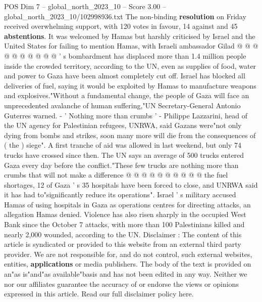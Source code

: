 \begin{textsample}{POS Dim 7 – global\_north\_2023\_10 – Score 3.00 – global\_north\_2023\_10/102998936.txt}
The non-binding \textbf{resolution} on Friday received overwhelming support, with 120 votes in favour, 14 against and 45 \textbf{abstentions}.
It was welcomed by Hamas but harshly criticised by Israel and the United States for failing to mention Hamas, with Israeli ambassador Gilad @ @ @ @ @ @ @ @ @ @ ' s bombardment has displaced more than 1.4 million people inside the crowded territory, according to the UN, even as supplies of food, water and power to Gaza have been almost completely cut off.
Israel has blocked all deliveries of fuel, saying it would be exploited by Hamas to manufacture weapons and explosives."Without a fundamental change, the people of Gaza will face an unprecedented avalanche of human suffering,"UN Secretary-General Antonio Guterres warned. - ' Nothing more than crumbs ' - Philippe Lazzarini, head of the UN agency for Palestinian refugees, UNRWA, said Gazans were"not only dying from bombs and strikes, soon many more will die from the consequences of ( the ) siege".
A first tranche of aid was allowed in last weekend, but only 74 trucks have crossed since then.
The UN says an average of 500 trucks entered Gaza every day before the conflict."These few trucks are nothing more than crumbs that will not make a difference @ @ @ @ @ @ @ @ @ @ the fuel shortages, 12 of Gaza ' s 35 hospitals have been forced to close, and UNRWA said it has had to"significantly reduce its operations".
Israel ' s military accused Hamas of using hospitals in Gaza as operations centres for directing attacks, an allegation Hamas denied.
Violence has also risen sharply in the occupied West Bank since the October 7 attacks, with more than 100 Palestinians killed and nearly 2,000 wounded, according to the UN.
Disclaimer : The content of this article is syndicated or provided to this website from an external third party provider.
We are not responsible for, and do not control, such external websites, entities, \textbf{applications} or media publishers.
The body of the text is provided on an"as is"and"as available"basis and has not been edited in any way.
Neither we nor our affiliates guarantee the accuracy of or endorse the views or opinions expressed in this article.
Read our full disclaimer policy here.

\end{textsample}
